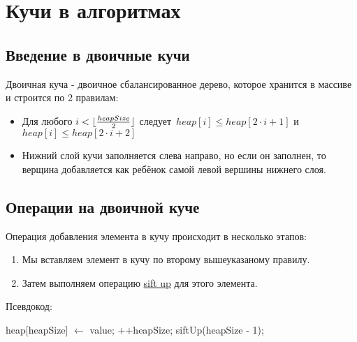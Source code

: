 ﻿

\section{Кучи в алгоритмах}\label{sec:--}

\subsection{Введение в двоичные кучи}\label{subsec:---2}

\begin{definition}
    Двоичная куча - двоичное сбалансированное дерево, которое хранится в массиве и строится по 2 правилам:
    \begin{itemize}
        \item Для любого $i < \lfloor \large{\frac{heapSize}{2}} \rfloor$ следует  $\, heap[i] \le heap[2\cdot i+1]$ и $heap[i] \le heap[2\cdot i+2]$
        \item Нижний слой кучи заполняется слева направо, но если он заполнен,
        то верщина добавляется как ребёнок самой левой вершины нижнего слоя.
    \end{itemize}
\end{definition}

\subsection{Операции на двоичной куче}\label{subsec:---3}

\begin{operation}
    Операция добавления элемента в кучу происходит в несколько этапов:
    \begin{enumerate}
        \item Мы вставляем элемент в кучу по второму вышеуказаному правилу.
        \item Затем выполняем операцию \hyperlink{su}{sift up} для этого элемента.
    \end{enumerate}
    Псевдокод:
    \begin{algorithmic}[0]
            \State heap[heapSize] $\gets$ value;
            \State ++heapSize;
            \State siftUp(heapSize - 1);
        \EndFunction
    \end{algorithmic}
\end{operation}

